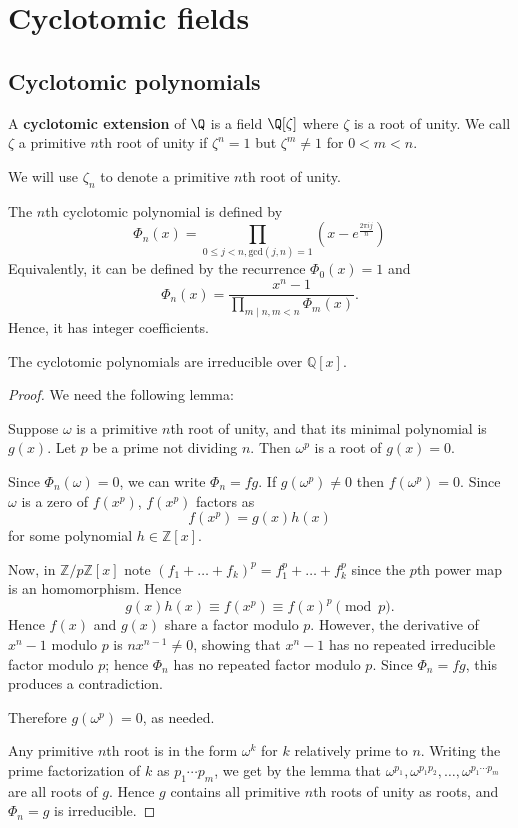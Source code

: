 \chapter{Cyclotomic fields}

\section{Cyclotomic polynomials}
\begin{df}
A \textbf{cyclotomic extension} of $\Q$ is a field $\Q[\zeta]$ where $\zeta$ is a root of unity. 
We call $\zeta$ a primitive $n$th root of unity if $\zeta^n=1$ but $\zeta^m\neq 1$ for $0<m<n$.
\end{df}
We will use $\zeta_n$ to denote a primitive $n$th root of unity.

The $n$th cyclotomic polynomial is defined by
\[ \Phi_n(x)=\prod_{0\leq j <n,\text{gcd}(j,n)=1}(x-e^{\frac{2\pi ij}{n}})\]
Equivalently, it can be defined by the recurrence $\Phi_0(x)=1$ and
\[ \Phi_n(x)=\frac{x^n-1}{\prod_{m\mid n,m<n}\Phi_m(x)}.\]
Hence, it has integer coefficients.
\begin{thm}
The cyclotomic polynomials are irreducible over $\mathbb{Q}[x]$.
\end{thm}
\begin{proof}
We need the following lemma:

Suppose $\omega$ is a primitive $n$th root of unity, and that its minimal polynomial is $g(x)$. Let $p$ be a prime not dividing $n$. Then $\omega^p$ is a root of $g(x)=0$.

Since $\Phi_n(\omega)=0$, we can write $\Phi_n=fg$. If $g(\omega^p)\neq 0$ then $f(\omega^p)=0$. Since $\omega$ is a zero of $f(x^p)$, $f(x^p)$ factors as
\[f(x^p)=g(x)h(x)\]
for some polynomial $h\in \mathbb{Z}[x]$.

Now, in $\mathbb{Z}/p\mathbb{Z}[x]$ note $(f_1+\ldots+f_k)^p=f_1^p+\ldots +f_k^p$ since the $p$th power map is an homomorphism. %
Hence
\[g(x)h(x)\equiv f(x^p)\equiv f(x)^p \pmod{p}.\]
Hence $f(x)$ and $g(x)$ share a factor modulo $p$.
However, the derivative of $x^n-1$ modulo $p$ is $nx^{n-1}\neq 0$, showing that $x^n-1$ has no repeated irreducible factor modulo $p$; hence $\Phi_n$ has no repeated factor modulo $p$. Since $\Phi_n=fg$, this produces a contradiction.

Therefore $g(\omega^p)=0$, as needed.

Any primitive $n$th root is in the form $\omega^{k}$ for $k$ relatively prime to $n$. Writing the prime factorization of $k$ as $p_1\cdots p_m$, we get by the lemma that $\omega^{p_1},\omega^{p_1p_2},\ldots, \omega^{p_1\cdots p_m}$ are all roots of $g$. Hence $g$ contains all primitive $n$th roots of unity as roots, and $\Phi_n=g$ is irreducible.
\end{proof}

